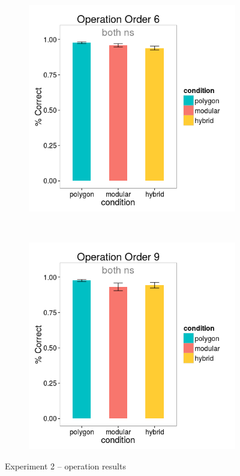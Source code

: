 \documentclass[man,mask,10pt]{apa6}
\begin{document}
\begin{figure}[H]
\centering
\begin{subfigure}[c]{0.3\textwidth}
\centering
\includegraphics[width=\textwidth]{figures/2/op_6_r.png}
\end{subfigure}
~
\begin{subfigure}[c]{0.3\textwidth}
\centering
\includegraphics[width=\textwidth]{figures/2/op_9_r.png}
\end{subfigure}
\caption{Experiment 2 -- operation results}
\label{ex2_op}
\end{figure} 
\end{document}
